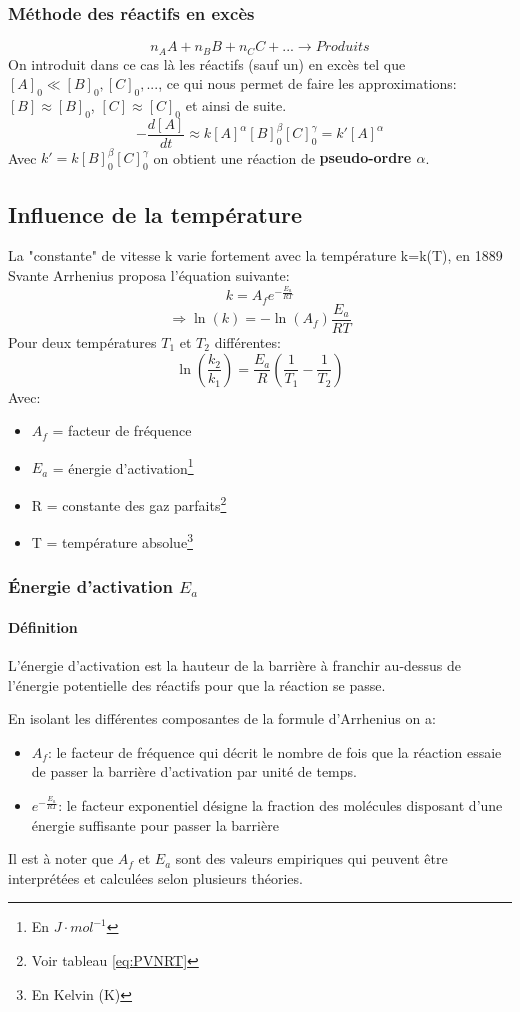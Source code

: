 \documentclass[10pt,a4paper]{book}
\begin{document}
\subsubsection{Méthode des réactifs en excès}
\[n_AA + n_BB + n_CC + ... \longrightarrow Produits\]
On introduit dans ce cas là les réactifs (sauf un) en excès tel que \([A]_0 \ll [B]_0, [C]_0, ...\), ce qui nous permet de faire les approximations: \([B] \approx [B]_0\), \([C] \approx [C]_0\) et ainsi de suite.
\[-\frac{d[A]}{dt} \approx k[A]^{\alpha}[B]^{\beta}_0[C]^{\gamma}_0 = k'[A]^{\alpha}\]
Avec \(k' = k[B]^{\beta}_0[C]^{\gamma}_0\) on obtient une réaction de \textbf{pseudo-ordre $\alpha$}.

\subsection{Influence de la température}

La "constante" de vitesse k varie fortement avec la température k=k(T), en 1889 Svante Arrhenius proposa l'équation suivante:
\[k = A_fe^{-\frac{E_a}{RT}}\]
\[\Rightarrow \ln(k) = -\ln(A_f)\frac{E_a}{RT}\]
Pour deux températures $T_1$ et $T_2$ différentes:
\[\ln\left(\frac{k_2}{k_1}\right) = \frac{E_a}{R}\left(\frac{1}{T_1}-\frac{1}{T_2}\right)\]
Avec:
\begin{itemize}
\item $A_f$ = facteur de fréquence
\item $E_a$ = énergie d'activation\footnote{En $J\cdot mol^{-1}$}
\item R = constante des gaz parfaits\footnote{Voir tableau \ref{eq:PVNRT}}
\item T = température absolue\footnote{En Kelvin (K)}
\end{itemize}

\subsubsection{Énergie d'activation \texorpdfstring{$E_a$}{Ea}}

\paragraph{Définition} L'énergie d'activation est la hauteur de la barrière à franchir au-dessus de l'énergie potentielle des réactifs pour que la réaction se passe. \par
En isolant les différentes composantes de la formule d'Arrhenius on a:
\begin{itemize}
\item $A_f$: le facteur de fréquence qui décrit le nombre de fois que la réaction essaie de passer la barrière d'activation par unité de temps.
\item \(e^{-\frac{E_a}{RT}}\): le facteur exponentiel désigne la fraction des molécules disposant d'une énergie suffisante pour passer la barrière
\end{itemize}
Il est à noter que $A_f$ et $E_a$ sont des valeurs empiriques qui peuvent être
interprétées et calculées selon plusieurs théories.
\end{document}
